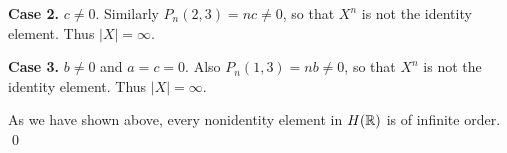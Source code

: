 \begin{enumerate}
\begin{enumerate}
            \textbf{Case 2.} $c \neq 0$. Similarly $P_n(2,3) = nc \neq 0$, so 
            that $X^n$ is not the identity element. Thus $|X| = \infty$.

            \textbf{Case 3.} $b \neq 0$ and $a = c = 0$. Also
            $P_n(1,3) = nb \neq 0$, so that $X^n$ is not the identity element. 
            Thus $|X| = \infty$.

            As we have shown above, every nonidentity element in $H(\mathbb{R})$ is of
            infinite order. \qed
   \end{enumerate}
\end{enumerate}
